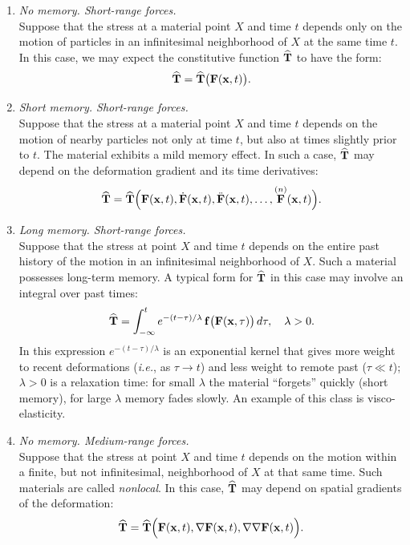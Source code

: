 \begin{enumerate}
	\item \textit{No memory. Short-range forces.} \\
	Suppose that the stress at a material point $X$ and time $t$ depends only on the motion of particles in an infinitesimal neighborhood of $X$ at the same time $t$. In this case, we may expect the constitutive function $\widehat{\mathbf{T}}$ to have the form:
	\begin{equation}
		\widehat{\mathbf{T}} = \widehat{\mathbf{T}}\big(\mathbf{F}(\mathbf{x}, t)\big).
	\end{equation}
	
	\item \textit{Short memory. Short-range forces.} \\
	Suppose that the stress at a material point $X$ and time $t$ depends on the motion of nearby particles not only at time $t$, but also at times slightly prior to $t$. The material exhibits a mild memory effect. In such a case, $\widehat{\mathbf{T}}$ may depend on the deformation gradient and its time derivatives:
	\begin{equation}
		\widehat{\mathbf{T}} = \widehat{\mathbf{T}}\Big(\mathbf{F}(\mathbf{x}, t), \dot{\mathbf{F}}(\mathbf{x}, t), \ddot{\mathbf{F}}(\mathbf{x}, t), \ldots, \overset{(n)}{\mathbf{F}}(\mathbf{x}, t)\Big).
	\end{equation}
	
	\item \textit{Long memory. Short-range forces.} \\
	Suppose that the stress at point $X$ and time $t$ depends on the entire past history of the motion in an infinitesimal neighborhood of $X$. Such a material possesses long-term memory. A typical form for $\widehat{\mathbf{T}}$ in this case may involve an integral over past times:
	\begin{equation}
		\widehat{\mathbf{T}} = \int_{-\infty}^t e^{-(t - \tau)/\lambda} \, \mathbf{f}\big(\mathbf{F}(\mathbf{x}, \tau)\big) \, d\tau, \quad \lambda > 0.
	\end{equation}
In this expression $e^{-(t - \tau)/\lambda}$ is  an exponential kernel that gives more weight to recent deformations (\textit{i.e.}, as $\tau\to t$) and less weight to remote past ($\tau\ll t$);
$\lambda>0$ is a relaxation time: for small $\lambda$ the material ``forgets'' quickly (short memory), for large $\lambda$ memory fades slowly.
An example of this class is visco-elasticity.

	
	\item \textit{No memory. Medium-range forces.} \\
	Suppose that the stress at point $X$ and time $t$ depends on the motion within a finite, but not infinitesimal, neighborhood of $X$ at that same time. Such materials are called \textit{nonlocal}. In this case, $\widehat{\mathbf{T}}$ may depend on spatial gradients of the deformation:
	\begin{equation}
		\widehat{\mathbf{T}} = \widehat{\mathbf{T}}\Big(\mathbf{F}(\mathbf{x}, t), \nabla \mathbf{F}(\mathbf{x}, t), \nabla\nabla \mathbf{F}(\mathbf{x}, t)\Big).
	\end{equation}
	

\end{enumerate}
